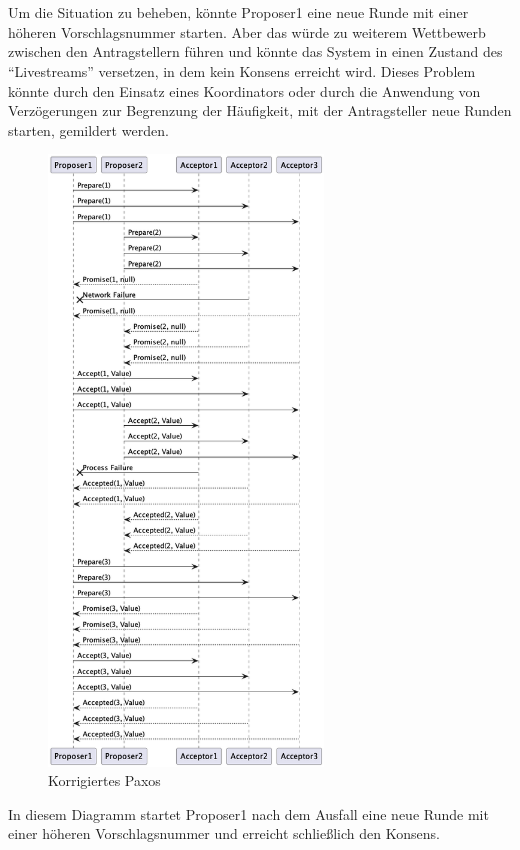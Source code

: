 \\\\
Um die Situation zu beheben, könnte Proposer1 eine neue Runde mit einer höheren Vorschlagsnummer starten. Aber das würde zu weiterem Wettbewerb zwischen den Antragstellern führen und könnte das System in einen Zustand des \enquote{Livestreams} versetzen, in dem kein Konsens erreicht wird. Dieses Problem könnte durch den Einsatz eines Koordinators oder durch die Anwendung von Verzögerungen zur Begrenzung der Häufigkeit, mit der Antragsteller neue Runden starten, gemildert werden.
\begin{figure}[!htp]
  \centering
  \includegraphics[width=0.65\textwidth]{fig/uml/paxos-issue-solve}
  \caption{Korrigiertes Paxos}
  \label{fig:simple-paxos-solve}
\end{figure}
In diesem Diagramm startet Proposer1 nach dem Ausfall eine neue Runde mit einer höheren Vorschlagsnummer und erreicht schließlich den Konsens.



